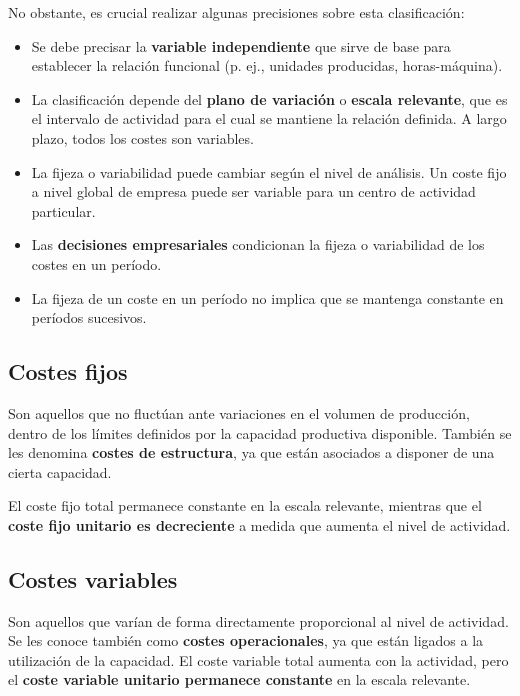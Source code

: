No obstante, es crucial realizar algunas precisiones sobre esta clasificación:
\begin{itemize}
    \item Se debe precisar la \textbf{variable independiente} que sirve de base para establecer la relación funcional (p. ej., unidades producidas, horas-máquina).
    \item La clasificación depende del \textbf{plano de variación} o \textbf{escala relevante}, que es el intervalo de actividad para el cual se mantiene la relación definida. A largo plazo, todos los costes son variables.
    \item La fijeza o variabilidad puede cambiar según el nivel de análisis. Un coste fijo a nivel global de empresa puede ser variable para un centro de actividad particular.
    \item Las \textbf{decisiones empresariales} condicionan la fijeza o variabilidad de los costes en un período.
    \item La fijeza de un coste en un período no implica que se mantenga constante en períodos sucesivos.
\end{itemize}

\subsection{Costes fijos}
Son aquellos que no fluctúan ante variaciones en el volumen de producción, dentro de los límites definidos por la capacidad productiva disponible. También se les denomina \textbf{costes de estructura}, ya que están asociados a disponer de una cierta capacidad.

El coste fijo total permanece constante en la escala relevante, mientras que el \textbf{coste fijo unitario es decreciente} a medida que aumenta el nivel de actividad.

\subsection{Costes variables}
Son aquellos que varían de forma directamente proporcional al nivel de actividad. Se les conoce también como \textbf{costes operacionales}, ya que están ligados a la utilización de la capacidad. El coste variable total aumenta con la actividad, pero el \textbf{coste variable unitario permanece constante} en la escala relevante.

